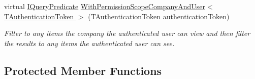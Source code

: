 \begin{DoxyCompactItemize}
virtual \hyperlink{interfaceCqrs_1_1Repositories_1_1Queries_1_1IQueryPredicate}{I\+Query\+Predicate} \hyperlink{classCqrs_1_1Repositories_1_1Queries_1_1QueryStrategy_ac21d8e8a04e218e1a7c283ad181e0e9f_ac21d8e8a04e218e1a7c283ad181e0e9f}{With\+Permission\+Scope\+Company\+And\+User$<$ T\+Authentication\+Token $>$} (T\+Authentication\+Token authentication\+Token)
\begin{DoxyCompactList}\small\item\em Filter to any items the company the authenticated user can view and then filter the results to any items the authenticated user can see. \end{DoxyCompactList}\end{DoxyCompactItemize}
\subsection*{Protected Member Functions}
